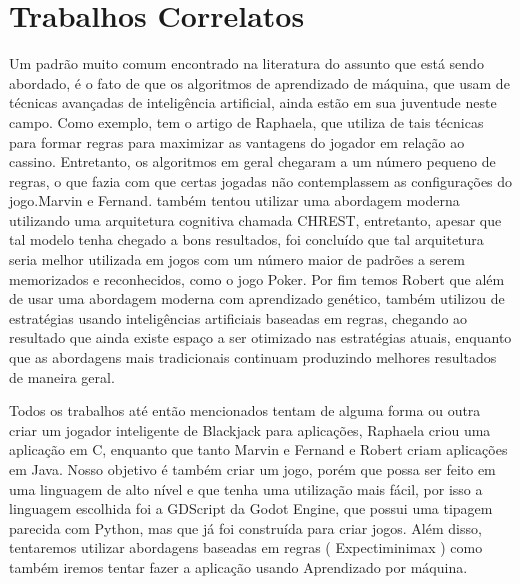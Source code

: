 \section{Trabalhos Correlatos}


    Um padrão muito comum encontrado na literatura do assunto que está sendo abordado, 
    é o fato de que os algoritmos de aprendizado de máquina, que usam de técnicas avançadas 
    de inteligência artificial, ainda estão em sua juventude neste campo. Como exemplo, tem o 
    artigo de Raphaela\cite{DefinicaoEstrategias}, que utiliza de tais técnicas para formar regras para maximizar 
    as vantagens do jogador em relação ao cassino. Entretanto, os algoritmos em geral chegaram
    a um número pequeno de regras, o que fazia com que certas jogadas não contemplassem as configurações 
    do jogo.Marvin e Fernand\cite{CognitiveAIModels}. também tentou utilizar uma abordagem moderna utilizando uma 
    arquitetura cognitiva chamada CHREST, entretanto, apesar que tal modelo tenha chegado a bons 
    resultados, foi concluído que tal arquitetura seria melhor utilizada em jogos com um número 
    maior de padrões a serem memorizados e reconhecidos, como o jogo Poker. Por fim temos Robert\cite{EmTurnos}
    que além de usar uma abordagem moderna com aprendizado genético, também utilizou de estratégias usando 
    inteligências artificiais baseadas em regras, chegando ao resultado que ainda existe espaço a 
    ser otimizado nas estratégias atuais, enquanto que as abordagens mais tradicionais
    continuam produzindo melhores resultados de maneira geral.

    Todos os trabalhos até então mencionados tentam de alguma forma ou outra 
    criar um jogador inteligente de Blackjack para aplicações, Raphaela\cite{DefinicaoEstrategias} criou 
    uma aplicação em C, enquanto que tanto Marvin e Fernand\cite{CognitiveAIModels} e Robert\cite{EmTurnos} criam 
    aplicações em Java. Nosso objetivo é também criar um jogo, porém que possa ser feito 
    em uma linguagem de alto nível e que tenha uma utilização mais fácil, por isso a linguagem 
    escolhida foi a GDScript da Godot Engine, que possui uma tipagem parecida com 
    Python, mas que já foi construída para criar jogos. Além disso, tentaremos utilizar abordagens baseadas 
    em regras ( Expectiminimax ) como também iremos tentar fazer a aplicação usando Aprendizado por máquina.